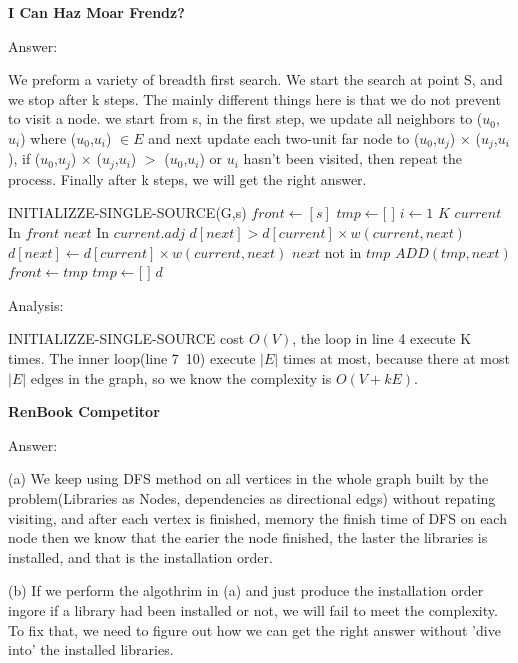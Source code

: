 \documentclass[12pt,twoside]{article}
\begin{document}
\begin{problems}

\problem {} \textbf{I Can Haz Moar Frendz?}

Answer:

\quad We preform a variety of breadth first search. We start the search at point S, and we stop after k steps. The mainly different things here is that we do not prevent to visit a node. we start from s, in the first step, we update all neighbors to ($u_0$,$u_i$) where ($u_0$,$u_i$) $\in E$ and next update each two-unit far node to ($u_0$,$u_j$) $ \times $ ($u_j$,$u_i$), if ($u_0$,$u_j$) $ \times $ ($u_j$,$u_i$) $>$ ($u_0$,$u_i$) or $u_i$ hasn't been visited, then repeat the process. Finally after k steps, we will get the right answer.

\begin{codebox}
\li INITIALIZZE-SINGLE-SOURCE(G,s)
\li $front \gets [s]$
\li $tmp \gets [$ $]$
\li \For $i \gets 1$ \To $K$ \Do
\li \For $current$ In $front$ \Do
\li \For $next$ In $current.adj$ \Do
\li \If $d[next] > d[current]\times w(current,next)$ \Do 
\li $d[next] \gets d[current]\times w(current,next)$
\li \If $next$ not in $tmp$ \Do
\li $ADD(tmp,next)$ \End \End \End \End 
\li $front \gets tmp$
\li $tmp\gets[$ $]$\End
\li \Return $d$
\end{codebox}

Analysis:

INITIALIZZE-SINGLE-SOURCE cost $O(V)$, the loop in line 4 execute K times.
The inner loop(line 7~10) execute $|E|$ times at most, because there at most $|E|$ edges in the graph, so we know the complexity is $O(V+kE)$.
\newpage

\problem {} \textbf{RenBook Competitor}

Answer:

(a)
We keep using DFS method on all vertices in the whole graph built by the problem(Libraries as Nodes, dependencies as directional edgs) without repating visiting, and after each vertex is finished, memory the finish time of DFS on each node then we know that the earier the node finished, the laster the libraries is installed, and that is the installation order.

(b)
If we perform the algothrim in (a) and just produce the installation order ingore if a library had been installed or not, we will fail to meet the complexity. To fix that, we need to figure out how we can get the right answer without 'dive into' the installed libraries.


\end{problems}
\end{document}
